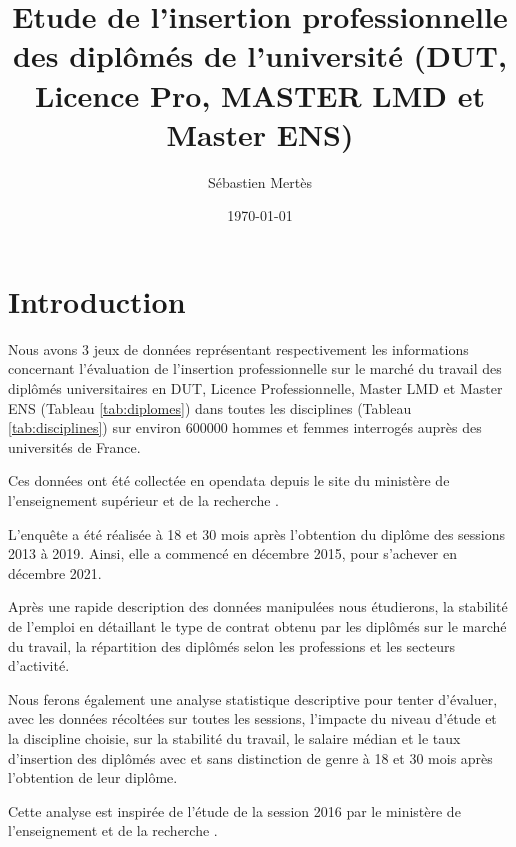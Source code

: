 \documentclass[12pt, a4paper, titlepage, table]{article}
\begin{document}
	\label{document}
	\title{Etude de l'insertion professionnelle des diplômés de l'université (DUT, Licence Pro, MASTER LMD et Master ENS)}
	\author{Sébastien Mertès}
	\date{\today}
	\maketitle
	\renewcommand{\thesection}{\arabic{section}.}
	\renewcommand{\thesubsection}{\thesection\arabic{subsection}}
	\renewcommand{\tablename}{Tableau}
	\renewcommand{\abstractname}{Résumé}
	\setlength{\parindent}{0pt}
	\captionsetup{labelfont=bf, font=small}
	\tableofcontents

\newpage
	
\section{Introduction}
	Nous avons 3 jeux de données représentant respectivement les informations concernant l'évaluation de l'insertion professionnelle sur le marché du travail des diplômés universitaires en DUT, Licence Professionnelle, Master LMD et Master ENS (Tableau \ref{tab:diplomes}) dans toutes les disciplines (Tableau \ref{tab:disciplines}) sur environ 600000 hommes et femmes interrogés auprès des universités de France.
	
	Ces données ont été collectée en opendata depuis le site du ministère de l'enseignement supérieur et de la recherche \cite{opendata}.
	
	L'enquête a été réalisée à 18 et 30 mois après l'obtention du diplôme des sessions  2013 à 2019. Ainsi, elle a commencé en décembre 2015, pour s'achever en décembre 2021.
	
	Après une rapide description des données manipulées nous étudierons, la stabilité de l'emploi en détaillant le type de contrat obtenu par les diplômés sur le marché du travail, la répartition des diplômés selon les professions et les secteurs d'activité.
	
	Nous ferons également une analyse statistique descriptive pour tenter d'évaluer, avec les données récoltées sur toutes les sessions, l'impacte du niveau d'étude et la discipline choisie,  sur la stabilité du travail, le salaire médian  et le taux d'insertion des diplômés avec et sans distinction de genre à 18 et 30 mois après l'obtention de leur diplôme.

	Cette analyse est inspirée de l'étude de la session 2016 par le ministère de l'enseignement et de la recherche \cite{etude 2016}.
	
\end{document}
